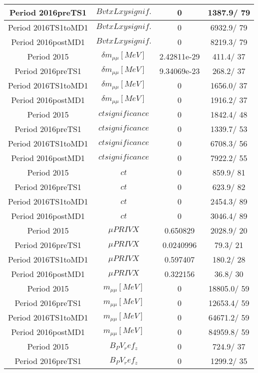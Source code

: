 \documentclass{article}
\begin{document}
\begin{longtable}{c|c|c|c}
\hline
 Period 2016preTS1 & $BvtxLxy signif.$ & 0 & 1387.9/ 79\\
\hline
 Period 2016TS1toMD1 & $BvtxLxy signif.$ & 0 & 6932.9/ 79\\
\hline
 Period 2016postMD1 & $BvtxLxy signif.$ & 0 & 8219.3/ 79\\
\hline
 Period 2015 & $\delta m_{\mu\mu} [MeV]$ & 2.42811e-29 & 411.4/ 37\\
\hline
 Period 2016preTS1 & $\delta m_{\mu\mu} [MeV]$ & 9.34069e-23 & 268.2/ 37\\
\hline
 Period 2016TS1toMD1 & $\delta m_{\mu\mu} [MeV]$ & 0 & 1656.0/ 37\\
\hline
 Period 2016postMD1 & $\delta m_{\mu\mu} [MeV]$ & 0 & 1916.2/ 37\\
\hline
 Period 2015 & $ct significance$ & 0 & 1842.4/ 48\\
\hline
 Period 2016preTS1 & $ct significance$ & 0 & 1339.7/ 53\\
\hline
 Period 2016TS1toMD1 & $ct significance$ & 0 & 6708.3/ 56\\
\hline
 Period 2016postMD1 & $ct significance$ & 0 & 7922.2/ 55\\
\hline
 Period 2015 & $ct$ & 0 & 859.9/ 81\\
\hline
 Period 2016preTS1 & $ct$ & 0 & 623.9/ 82\\
\hline
 Period 2016TS1toMD1 & $ct$ & 0 & 2454.3/ 89\\
\hline
 Period 2016postMD1 & $ct$ & 0 & 3046.4/ 89\\
\hline
 Period 2015 & $\mu PRIVX$ & 0.650829 & 2028.9/ 20\\
\hline
 Period 2016preTS1 & $\mu PRIVX$ & 0.0240996 &  79.3/ 21\\
\hline
 Period 2016TS1toMD1 & $\mu PRIVX$ & 0.597407 & 180.2/ 28\\
\hline
 Period 2016postMD1 & $\mu PRIVX$ & 0.322156 &  36.8/ 30\\
\hline
 Period 2015 & $m_{\mu\mu} [MeV]$ & 0 & 18805.0/ 59\\
\hline
 Period 2016preTS1 & $m_{\mu\mu} [MeV]$ & 0 & 12653.4/ 59\\
\hline
 Period 2016TS1toMD1 & $m_{\mu\mu} [MeV]$ & 0 & 64671.2/ 59\\
\hline
 Period 2016postMD1 & $m_{\mu\mu} [MeV]$ & 0 & 84959.8/ 59\\
\hline
 Period 2015 & $B_PV_ref_z$ & 0 & 724.9/ 37\\
\hline
 Period 2016preTS1 & $B_PV_ref_z$ & 0 & 1299.2/ 35\\

\end{longtable}
\end{document}
